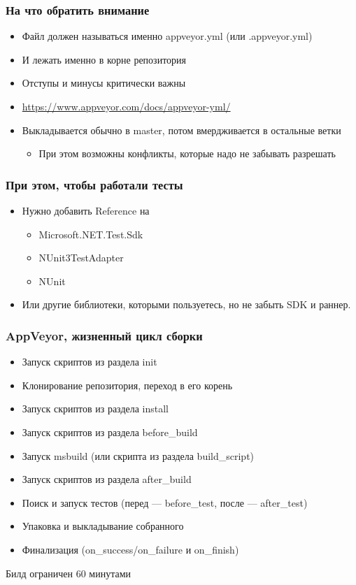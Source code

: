 \documentclass[xetex,mathserif,serif]{beamer}
\begin{document}
	\begin{frame}
		\frametitle{На что обратить внимание}
		\begin{itemize}
			\item Файл должен называться именно appveyor.yml (или .appveyor.yml)
			\item И лежать именно в корне репозитория
			\item Отступы и минусы критически важны
			\item \url{https://www.appveyor.com/docs/appveyor-yml/}
			\item Выкладывается обычно в master, потом вмердживается в остальные ветки
			\begin{itemize}
				\item При этом возможны конфликты, которые надо не забывать разрешать
			\end{itemize}
		\end{itemize}
	\end{frame}

	\begin{frame}
		\frametitle{При этом, чтобы работали тесты}
		\begin{itemize}
			\item Нужно добавить Reference на
			\begin{itemize}
				\item Microsoft.NET.Test.Sdk
				\item NUnit3TestAdapter
				\item NUnit
			\end{itemize}
			\item Или другие библиотеки, которыми пользуетесь, но не забыть SDK и раннер.
		\end{itemize}
	\end{frame}

	\begin{frame}
		\frametitle{AppVeyor, жизненный цикл сборки}
		\begin{itemize}
			\item Запуск скриптов из раздела init
			\item Клонирование репозитория, переход в его корень
			\item Запуск скриптов из раздела install
			\item Запуск скриптов из раздела before\_build
			\item Запуск msbuild (или скрипта из раздела build\_script)
			\item Запуск скриптов из раздела after\_build 
			\item Поиск и запуск тестов (перед --- before\_test, после --- after\_test)
			\item Упаковка и выкладывание собранного
			\item Финализация (on\_success/on\_failure и on\_finish)
		\end{itemize}
		Билд ограничен 60 минутами
	\end{frame}
\end{document}
